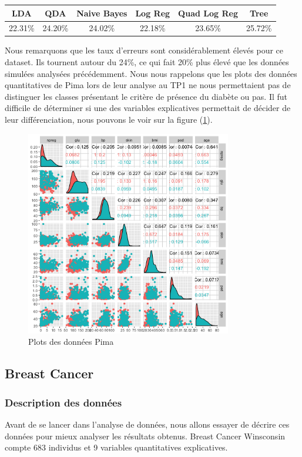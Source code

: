 \documentclass[10pt]{article}
\begin{document}
\begin{center}
	\begin{tabular}{|c | c | c| c| c| c|}
		\hline
		LDA & QDA & Naive Bayes & Log Reg & Quad Log Reg & Tree\\
		\hline	
		22.31\% & 24.20\% & 24.02\% & 22.18\% & 23.65\% & 25.72\%
	\end{tabular}
\end{center}

Nous remarquons que les taux d'erreurs sont considérablement élevés pour ce dataset. Ils tournent autour du 24\%, ce qui fait 20\% plus élevé que les données simulées analysées précédemment. Nous nous rappelons que les plots des données quantitatives de Pima lors de leur analyse au TP1 ne nous permettaient pas de distinguer les classes présentant le critère de présence du diabète ou pas. Il fut difficile de déterminer si une des variables explicatives permettait de décider de leur différenciation, nous pouvons le voir sur la figure (\ref{fig:plotPima}). 
\begin{figure}[H]
	\centering
	\includegraphics[width=9cm]{Figures/plot_Pimaquant.png}%
	\caption{Plots des données Pima}%
	\label{fig:plotPima}
\end{figure}

\subsection{Breast Cancer}
\subsubsection{Description des données}
Avant de se lancer dans l'analyse de données, nous allons essayer de décrire ces données pour mieux analyser les résultats obtenus. Breast Cancer Winsconsin compte 683 individus et 9 variables quantitatives explicatives.
\end{document}
